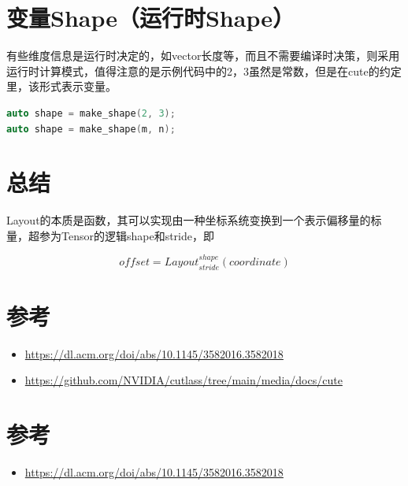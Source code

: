 \section{变量Shape（运行时Shape）}

有些维度信息是运行时决定的，如vector长度等，而且不需要编译时决策，则采用运行时计算模式，值得注意的是示例代码中的2，3虽然是常数，但是在cute的约定里，该形式表示变量。

\begin{lstlisting}[language=C++]
auto shape = make_shape(2, 3);
auto shape = make_shape(m, n);
\end{lstlisting}

\section{总结}

Layout的本质是函数，其可以实现由一种坐标系统变换到一个表示偏移量的标量，超参为Tensor的逻辑shape和stride，即

\begin{equation*}
offset = Layout^{shape}_{stride}(coordinate)
\end{equation*}

\section{参考}

\begin{itemize}
  \item \url{https://dl.acm.org/doi/abs/10.1145/3582016.3582018}
  \item \url{https://github.com/NVIDIA/cutlass/tree/main/media/docs/cute}
\end{itemize}

\section{参考}

\begin{itemize}
  \item \url{https://dl.acm.org/doi/abs/10.1145/3582016.3582018}
\end{itemize}
